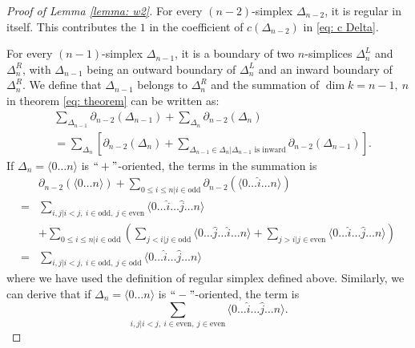 \documentclass[12pt]{article}
\begin{document}
\begin{proof}[Proof of Lemma \ref{lemma: w2}]
For every $(n-2)$-simplex $\Delta_{n-2}$, it is regular in itself. This contributes the $1$ in the coefficient of $c(\Delta_{n-2})$ in \eqref{eq: c Delta}.

For every $(n-1)$-simplex $\Delta_{n-1}$, it is a boundary of two $n$-simplices $\Delta^L_n$ and $\Delta^R_n$, with $\Delta_{n-1}$ being an outward boundary of $\Delta^L_n$ and an inward boundary of $\Delta^R_n$. We define that $\Delta_{n-1}$ belongs to $\Delta^R_n$ and the summation of $\dim k= n-1,~n$ in theorem \ref{eq: theorem} can be written as:
\begin{equation}
    \begin{split}
        &\sum_{\Delta_{n-1}} \partial_{n-2} (\Delta_{n-1}) + \sum_{\Delta_{n}} \partial_{n-2} (\Delta_{n}) \\
        &= \sum_{\Delta_{n}} \left[ \partial_{n-2} (\Delta_{n}) + \sum_{\Delta_{n-1} \in \Delta_{n} | \Delta_{n-1} \text{ is inward} } \partial_{n-2} (\Delta_{n-1})\right].
    \end{split}
\end{equation}
If $\Delta_n = \langle 0 \dots n \rangle$ is $``+"$-oriented, the terms in the summation is
\begin{equation}
    \begin{split}
        &\partial_{n-2}(\langle 0 \dots n \rangle) + \sum_{0 \leq i \leq n | i \in  \text{odd}} \partial_{n-2}(\langle 0 \dots \hat{i} \dots n \rangle) \\
        =& \sum_{ i,j| i<j,~i \in  \text{odd},~j \in \text{even}} \langle 0 \dots \hat{i} \dots \hat{j} \dots n \rangle \\
        &+ \sum_{0 \leq i \leq n | i \in  \text{odd}} (\sum_{j<i | j\in \text{odd}} \langle 0 \dots \hat{j} \dots \hat{i} \dots n \rangle + \sum_{j>i | j\in \text{even}} \langle 0 \dots \hat{i} \dots \hat{j} \dots n \rangle) \\
        =& \sum_{ i,j| i<j,~i \in  \text{odd},~j \in \text{odd}} \langle 0 \dots \hat{i} \dots \hat{j} \dots n \rangle
        \end{split}
\label{eq: + contribution}
\end{equation}
where we have used the definition of regular simplex defined above.
Similarly, we can derive that if $\Delta_n = \langle 0 \dots n \rangle$ is $``-"$-oriented, the term is
\begin{equation}
    \sum_{ i,j| i<j,~i \in  \text{even},~j \in \text{even}} \langle 0 \dots \hat{i} \dots \hat{j} \dots n \rangle.

\end{equation}
\end{proof}
\end{document}
